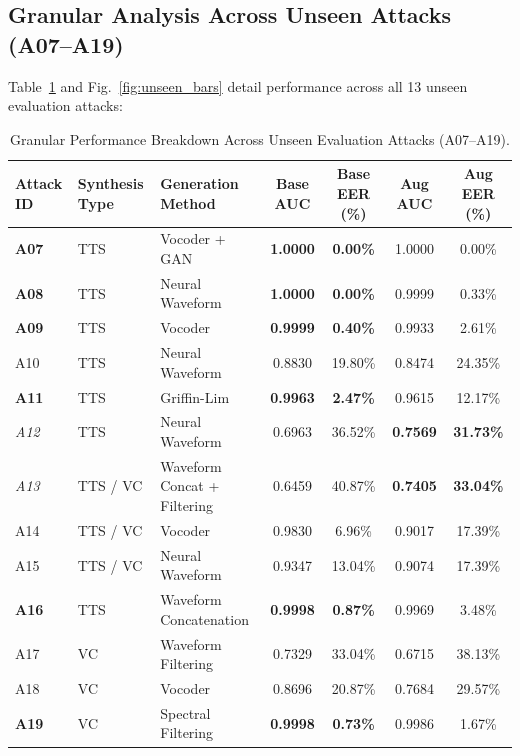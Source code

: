 \documentclass[runningheads]{llncs}
\begin{document}
\subsection{Granular Analysis Across Unseen Attacks (A07--A19)}
\label{subsec:unseen_breakdown}
Table~\ref{tab:unseen_breakdown} and Fig.~\ref{fig:unseen_bars} detail performance across all 13 unseen evaluation attacks:

\begin{table}[!t]
\caption{Granular Performance Breakdown Across Unseen Evaluation Attacks (A07--A19).}
\label{tab:unseen_breakdown}
\centering
\scriptsize
\begin{tabular}{lllcccc}
\toprule
\textbf{Attack ID} & \textbf{Synthesis Type} & \textbf{Generation Method} & \textbf{Base AUC} & \textbf{Base EER (\%)} & \textbf{Aug AUC} & \textbf{Aug EER (\%)} \\
\midrule
\textbf{A07} & TTS & Vocoder + GAN & \textbf{1.0000} & \textbf{0.00\%} & 1.0000 & 0.00\% \\
\textbf{A08} & TTS & Neural Waveform & \textbf{1.0000} & \textbf{0.00\%} & 0.9999 & 0.33\% \\
\textbf{A09} & TTS & Vocoder & \textbf{0.9999} & \textbf{0.40\%} & 0.9933 & 2.61\% \\
A10 & TTS & Neural Waveform & 0.8830 & 19.80\% & 0.8474 & 24.35\% \\
\textbf{A11} & TTS & Griffin-Lim & \textbf{0.9963} & \textbf{2.47\%} & 0.9615 & 12.17\% \\
\textit{A12} & TTS & Neural Waveform & 0.6963 & 36.52\% & \textbf{0.7569} & \textbf{31.73\%} \\
\textit{A13} & TTS / VC & Waveform Concat + Filtering & 0.6459 & 40.87\% & \textbf{0.7405} & \textbf{33.04\%} \\
A14 & TTS / VC & Vocoder & 0.9830 & 6.96\% & 0.9017 & 17.39\% \\
A15 & TTS / VC & Neural Waveform & 0.9347 & 13.04\% & 0.9074 & 17.39\% \\
\textbf{A16} & TTS & Waveform Concatenation & \textbf{0.9998} & \textbf{0.87\%} & 0.9969 & 3.48\% \\
A17 & VC & Waveform Filtering & 0.7329 & 33.04\% & 0.6715 & 38.13\% \\
A18 & VC & Vocoder & 0.8696 & 20.87\% & 0.7684 & 29.57\% \\
\textbf{A19} & VC & Spectral Filtering & \textbf{0.9998} & \textbf{0.73\%} & 0.9986 & 1.67\% \\
\bottomrule
\end{tabular}
\end{table}
\end{document}
